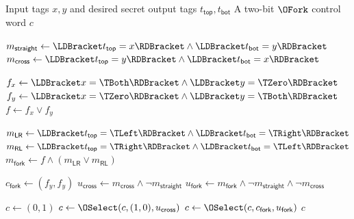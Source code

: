 \begin{algorithm}[t]
\caption{$\OForkControl(x,y,t_{\mathsf{top}},t_{\mathsf{bot}})$}
\label{alg:ofr-choose-ofork-control}
\begin{algorithmic}[1]
\Require Input tags $x,y$ and desired secret output tags $t_{\mathsf{top}},t_{\mathsf{bot}}$
\Ensure A two-bit $\OFork$ control word $c$

\State $m_{\mathsf{straight}}\gets
       \LDBracket t_{\mathsf{top}}=x \RDBracket
       \land
       \LDBracket t_{\mathsf{bot}}=y \RDBracket$
\State $m_{\mathsf{cross}}\gets
       \LDBracket t_{\mathsf{top}}=y \RDBracket
       \land
       \LDBracket t_{\mathsf{bot}}=x \RDBracket$

\State $f_x\gets
       \LDBracket x=\TBoth \RDBracket
       \land
       \LDBracket y=\TZero \RDBracket$
\State $f_y\gets
       \LDBracket x=\TZero \RDBracket
       \land
       \LDBracket y=\TBoth \RDBracket$
\State $f\gets f_x\lor f_y$

\State $m_{\mathsf{LR}}\gets
       \LDBracket t_{\mathsf{top}}=\TLeft \RDBracket
       \land
       \LDBracket t_{\mathsf{bot}}=\TRight \RDBracket$
\State $m_{\mathsf{RL}}\gets
       \LDBracket t_{\mathsf{top}}=\TRight \RDBracket
       \land
       \LDBracket t_{\mathsf{bot}}=\TLeft \RDBracket$
\State $m_{\mathsf{fork}}\gets
       f\land(m_{\mathsf{LR}}\lor m_{\mathsf{RL}})$

\State $c_{\mathsf{fork}}\gets(f_y,f_y)$
\State $u_{\mathsf{cross}}\gets
       m_{\mathsf{cross}}\land\neg m_{\mathsf{straight}}$
\State $u_{\mathsf{fork}}\gets
       m_{\mathsf{fork}}\land\neg m_{\mathsf{straight}}
       \land\neg m_{\mathsf{cross}}$

\State $c\gets(0,1)$
\State $c\gets\OSelect(c,(1,0),u_{\mathsf{cross}})$
\State $c\gets\OSelect(c,c_{\mathsf{fork}},u_{\mathsf{fork}})$
\State \Return $c$
\end{algorithmic}
\end{algorithm}


